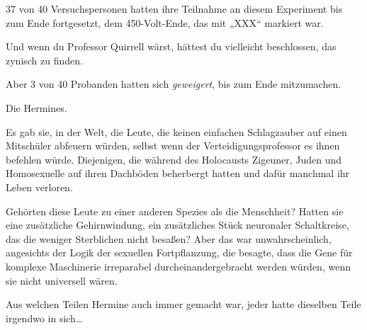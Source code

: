 37 von 40 Versuchspersonen hatten ihre Teilnahme an diesem Experiment bis zum Ende fortgesetzt, dem 450-Volt-Ende, das mit „XXX“ markiert war.

Und wenn du Professor Quirrell wärst, hättest du vielleicht beschlossen, das zynisch zu finden.

Aber 3 von 40 Probanden hatten sich \emph{geweigert}, bis zum Ende mitzumachen.

Die Hermines.

Es gab sie, in der Welt, die Leute, die keinen einfachen Schlagzauber auf einen Mitschüler abfeuern würden, selbst wenn der Verteidigungsprofessor es ihnen befehlen würde. Diejenigen, die während des Holocausts Zigeuner, Juden und Homosexuelle auf ihren Dachböden beherbergt hatten und dafür manchmal ihr Leben verloren.

Gehörten diese Leute zu einer anderen Spezies als die Menschheit? Hatten sie eine zusätzliche Gehirnwindung, ein zusätzliches Stück neuronaler Schaltkreise, das die weniger Sterblichen nicht besaßen? Aber das war unwahrscheinlich, angesichts der Logik der sexuellen Fortpflanzung, die besagte, dass die Gene für komplexe Maschinerie irreparabel durcheinandergebracht werden würden, wenn sie nicht universell wären.

Aus welchen Teilen Hermine auch immer gemacht war, jeder hatte dieselben Teile irgendwo in sich…

